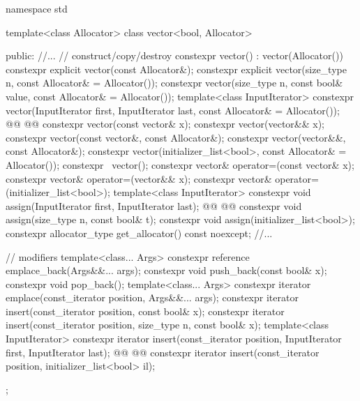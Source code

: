 \documentclass{wg21}
\begin{document}
\pnum
{}%

\begin{codeblock}
namespace std {
    template<class Allocator>
    class vector<bool, Allocator> {
        public:
        //...
        // construct/copy/destroy
        constexpr vector() : vector(Allocator()) { }
        constexpr explicit vector(const Allocator&);
        constexpr explicit vector(size_type n, const Allocator& = Allocator());
        constexpr vector(size_type n, const bool& value, const Allocator& = Allocator());
        template<class InputIterator>
        constexpr vector(InputIterator first, InputIterator last, const Allocator& = Allocator());
        @@
        @@
        constexpr vector(const vector& x);
        constexpr vector(vector&& x);
        constexpr vector(const vector&, const Allocator&);
        constexpr vector(vector&&, const Allocator&);
        constexpr vector(initializer_list<bool>, const Allocator& = Allocator());
        constexpr ~vector();
        constexpr vector& operator=(const vector& x);
        constexpr vector& operator=(vector&& x);
        constexpr vector& operator=(initializer_list<bool>);
        template<class InputIterator>
        constexpr void assign(InputIterator first, InputIterator last);
        @@
        @@
        constexpr void assign(size_type n, const bool& t);
        constexpr void assign(initializer_list<bool>);
        constexpr allocator_type get_allocator() const noexcept;
        //...
        
        // modifiers
        template<class... Args> constexpr reference emplace_back(Args&&... args);
        constexpr void push_back(const bool& x);
        constexpr void pop_back();
        template<class... Args> constexpr iterator emplace(const_iterator position, Args&&... args);
        constexpr iterator insert(const_iterator position, const bool& x);
        constexpr iterator insert(const_iterator position, size_type n, const bool& x);
        template<class InputIterator>
        constexpr iterator insert(const_iterator position, InputIterator first, InputIterator last);
        @@
        @@
        constexpr iterator insert(const_iterator position, initializer_list<bool> il);
    };
}
\end{codeblock}%
\end{document}
